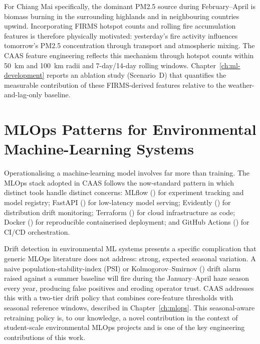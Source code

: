 For Chiang Mai specifically, the dominant PM2.5 source during February--April
is biomass burning in the surrounding highlands and in neighbouring countries
upwind. Incorporating FIRMS hotspot counts and rolling fire accumulation
features is therefore physically motivated: yesterday's fire activity
influences tomorrow's PM2.5 concentration through transport and atmospheric
mixing. The CAAS feature engineering reflects this mechanism through
hotspot counts within 50~km and 100~km radii and 7-day/14-day rolling
windows. Chapter~\ref{ch:ml-development} reports an ablation study
(Scenario~D) that quantifies the measurable contribution of these
FIRMS-derived features relative to the weather-and-lag-only baseline.

\section{MLOps Patterns for Environmental Machine-Learning Systems}

Operationalising a machine-learning model involves far more than training.
The MLOps stack adopted in CAAS follows the now-standard pattern in which
distinct tools handle distinct concerns: MLflow (\cite{mlflow}) for
experiment tracking and model registry; FastAPI (\cite{fastapi}) for
low-latency model serving; Evidently (\cite{evidently}) for distribution
drift monitoring; Terraform (\cite{terraform}) for cloud infrastructure
as code; Docker (\cite{docker}) for reproducible containerised deployment;
and GitHub Actions (\cite{githubactions}) for CI/CD orchestration.

Drift detection in environmental ML systems presents a specific complication
that generic MLOps literature does not address: strong, expected seasonal
variation. A naive population-stability-index (PSI) or
Kolmogorov--Smirnov (\cite{ks_test}) drift alarm raised against a summer
baseline will fire during the January--April haze season every year, producing
false positives and eroding operator trust. CAAS addresses this with a
two-tier drift policy that combines core-feature thresholds with seasonal
reference windows, described in Chapter~\ref{ch:mlops}. This seasonal-aware
retraining policy is, to our knowledge, a novel contribution in the context
of student-scale environmental MLOps projects and is one of the key
engineering contributions of this work.
